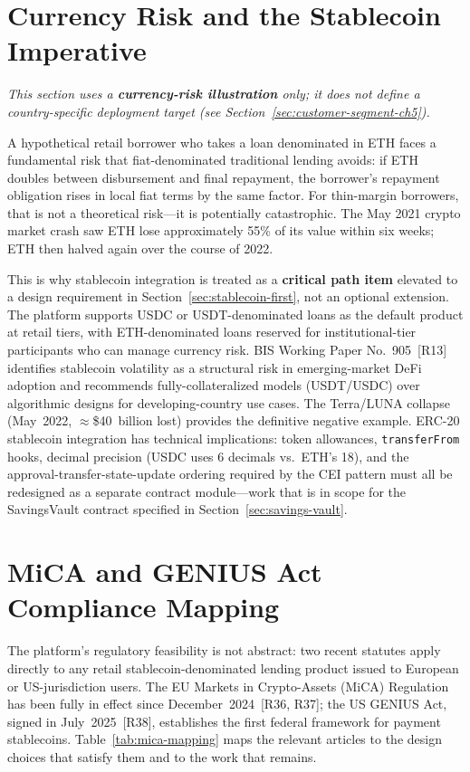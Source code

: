 \documentclass[12pt,a4paper]{report}
\begin{document}
\section{Currency Risk and the Stablecoin Imperative}

\noindent\textit{\small This section uses a \textbf{currency-risk illustration} only; it does not define a country-specific deployment target (see Section~\ref{sec:customer-segment-ch5}).}

A hypothetical retail borrower who takes a loan denominated in ETH faces a fundamental risk that fiat-denominated traditional lending avoids: if ETH doubles between disbursement and final repayment, the borrower's repayment obligation rises in local fiat terms by the same factor. For thin-margin borrowers, that is not a theoretical risk---it is potentially catastrophic. The May 2021 crypto market crash saw ETH lose approximately 55\% of its value within six weeks; ETH then halved again over the course of 2022.

This is why stablecoin integration is treated as a \textbf{critical path item} elevated to a design requirement in Section~\ref{sec:stablecoin-first}, not an optional extension. The platform supports USDC or USDT-denominated loans as the default product at retail tiers, with ETH-denominated loans reserved for institutional-tier participants who can manage currency risk. BIS Working Paper No.~905~[R13] identifies stablecoin volatility as a structural risk in emerging-market DeFi adoption and recommends fully-collateralized models (USDT/USDC) over algorithmic designs for developing-country use cases. The Terra/LUNA collapse (May~2022, $\approx$\$40~billion lost) provides the definitive negative example. ERC-20 stablecoin integration has technical implications: token allowances, \texttt{transferFrom} hooks, decimal precision (USDC uses 6 decimals vs.\ ETH's 18), and the approval-transfer-state-update ordering required by the CEI pattern must all be redesigned as a separate contract module---work that is in scope for the SavingsVault contract specified in Section~\ref{sec:savings-vault}.

\section{MiCA and GENIUS Act Compliance Mapping}
\label{sec:mica-compliance}

The platform's regulatory feasibility is not abstract: two recent statutes apply directly to any retail stablecoin-denominated lending product issued to European or US-jurisdiction users. The EU Markets in Crypto-Assets (MiCA) Regulation has been fully in effect since December~2024~[R36, R37]; the US GENIUS Act, signed in July~2025~[R38], establishes the first federal framework for payment stablecoins. Table~\ref{tab:mica-mapping} maps the relevant articles to the design choices that satisfy them and to the work that remains.
\end{document}
